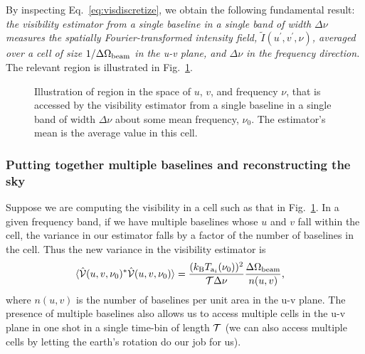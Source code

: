 \documentclass[11pt]{article}
\numberwithin{equation}{section}
\newcommand{\wt}[1]{\widetilde{#1}}
\begin{document}
By inspecting Eq.~\eqref{eq:visdiscretize}, we obtain the following fundamental result: {\em the visibility estimator from a single baseline in a single band of width $\Delta \nu$ measures the spatially Fourier-transformed intensity field, $\wt{I}(u^\prime, v^\prime, \nu)$, averaged over a cell of size $1/\Delta \Omega_{\rm beam}$ in the u-v plane, and $\Delta \nu$ in the frequency direction.} The relevant region is illustrated in Fig.~\ref{fig:singlecell}.

\begin{figure}[t]
  \centering
  \caption{\label{fig:singlecell} Illustration of region in the space of $u$, $v$, and frequency $\nu$, that is accessed by the visibility estimator from a single baseline in a single band of width $\Delta \nu$ about some mean frequency, $\nu_0$. The estimator's mean is the average value in this cell.}
\end{figure}

\subsubsection{Putting together multiple baselines and reconstructing the sky}
\label{subsubsec:multiplebl}

Suppose we are computing the visibility in a cell such as that in Fig.~\ref{fig:singlecell}. In a given frequency band, if we have multiple baselines whose $u$ and $v$ fall within the cell, the variance in our estimator falls by a factor of the number of baselines in the cell. Thus the new variance in the visibility estimator is
\begin{align}
  \langle \hat{\cal V}(u, v, \nu_0)^\ast \hat{\cal V}(u, v, \nu_0) \rangle & = \frac{( k_{\rm B} T_{{\rm a}_i}(\nu_0) )^2}{{\cal T} \Delta \nu} \frac{\Delta \Omega_{\rm beam}}{n(u, v)} \mbox{,} \label{eq:visibilitymult}
\end{align}
where $n(u, v)$ is the number of baselines per unit area in the u-v plane. The presence of multiple baselines also allows us to access multiple cells in the u-v plane in one shot in a single time-bin of length $\cal T$ (we can also access multiple cells by letting the earth's rotation do our job for us).
\end{document}
